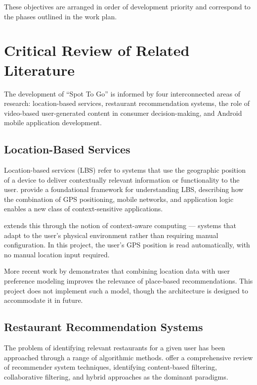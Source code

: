 \documentclass[12pt, a4paper]{article}
\begin{document}
These objectives are arranged in order of development priority and correspond to the phases outlined in the work plan.

\section{Critical Review of Related Literature}

The development of ``Spot To Go'' is informed by four interconnected areas of research: location-based services, restaurant recommendation systems, the role of video-based user-generated content in consumer decision-making, and Android mobile application development.

\subsection{Location-Based Services}

Location-based services (LBS) refer to systems that use the geographic position of a device to deliver contextually relevant information or functionality to the user. \citet{schiller2004} provide a foundational framework for understanding LBS, describing how the combination of GPS positioning, mobile networks, and application logic enables a new class of context-sensitive applications.

\citet{dey2001} extends this through the notion of context-aware computing — systems that adapt to the user's physical environment rather than requiring manual configuration. In this project, the user's GPS position is read automatically, with no manual location input required.

More recent work by \citet{bao2012} demonstrates that combining location data with user preference modeling improves the relevance of place-based recommendations. This project does not implement such a model, though the architecture is designed to accommodate it in future.

\subsection{Restaurant Recommendation Systems}

The problem of identifying relevant restaurants for a given user has been approached through a range of algorithmic methods. \citet{adomavicius2005} offer a comprehensive review of recommender system techniques, identifying content-based filtering, collaborative filtering, and hybrid approaches as the dominant paradigms.
\end{document}
